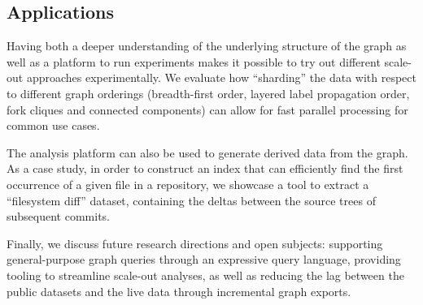 \subsection*{Applications}

Having both a deeper understanding of the underlying structure of the graph as
well as a platform to run experiments makes it possible to try out different
scale-out approaches experimentally. We evaluate how ``sharding'' the data with
respect to different graph orderings (breadth-first order, layered label
propagation order, fork cliques and connected components) can allow for fast
parallel processing for common use cases.

The analysis platform can also be used to generate derived data from the graph.
As a case study, in order to construct an index that can efficiently find the
first occurrence of a given file in a repository, we showcase a tool to extract
a ``filesystem diff'' dataset, containing the deltas between the source trees
of subsequent commits.

Finally, we discuss future research directions and open subjects: supporting
general-purpose graph queries through an expressive query language, providing
tooling to streamline scale-out analyses, as well as reducing the lag between
the public datasets and the live data through incremental graph exports.
